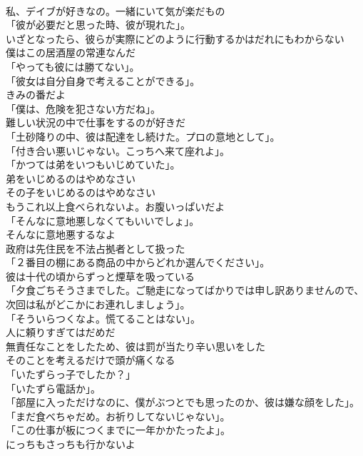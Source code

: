 \documentclass[8pt]{extreport}
\begin{document}
\begin{CJK}{UTF8}{min}
\\	私、デイブが好きなの。一緒にいて気が楽だもの	
\\	「彼が必要だと思った時、彼が現れた」。	
\\	いざとなったら、彼らが実際にどのように行動するかはだれにもわからない	
\\	僕はこの居酒屋の常連なんだ	
\\	「やっても彼には勝てない」。	
\\	「彼女は自分自身で考えることができる」。	
\\	きみの番だよ	
\\	「僕は、危険を犯さない方だね」。	
\\	難しい状況の中で仕事をするのが好きだ	
\\	「土砂降りの中、彼は配達をし続けた。プロの意地として」。	
\\	「付き合い悪いじゃない。こっちへ来て座れよ」。	
\\	「かつては弟をいつもいじめていた」。	
\\	弟をいじめるのはやめなさい	
\\	その子をいじめるのはやめなさい	
\\	もうこれ以上食べられないよ。お腹いっぱいだよ	
\\	「そんなに意地悪しなくてもいいでしょ」。	
\\	そんなに意地悪するなよ	
\\	政府は先住民を不法占拠者として扱った	
\\	「２番目の棚にある商品の中からどれか選んでください」。	
\\	彼は十代の頃からずっと煙草を吸っている	
\\	「夕食ごちそうさまでした。ご馳走になってばかりでは申し訳ありませんので、次回は私がどこかにお連れしましょう」。	
\\	「そういらつくなよ。慌てることはない」。	
\\	人に頼りすぎてはだめだ	
\\	無責任なことをしたため、彼は罰が当たり辛い思いをした	
\\	そのことを考えるだけで頭が痛くなる	
\\	「いたずらっ子でしたか？」	
\\	「いたずら電話か」。	
\\	「部屋に入っただけなのに、僕がぶつとでも思ったのか、彼は嫌な顔をした」。	
\\	「まだ食べちゃだめ。お祈りしてないじゃない」。	
\\	「この仕事が板につくまでに一年かかたったよ」。	
\\	にっちもさっちも行かないよ	

\end{CJK}
\end{document}
